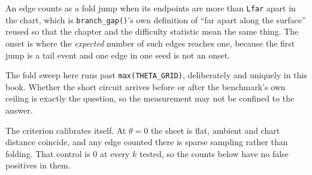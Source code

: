 \documentclass[
  british,
  a4paper,
]{book}
\newenvironment{Shaded}{\begin{snugshade}}{\end{snugshade}}
\newcommand{\AttributeTok}[1]{\textcolor[rgb]{0.13,0.29,0.53}{#1}}
\newcommand{\ControlFlowTok}[1]{\textcolor[rgb]{0.13,0.29,0.53}{\textbf{#1}}}
\newcommand{\DecValTok}[1]{\textcolor[rgb]{0.00,0.00,0.81}{#1}}
\newcommand{\FunctionTok}[1]{\textcolor[rgb]{0.13,0.29,0.53}{\textbf{#1}}}
\newcommand{\NormalTok}[1]{#1}
\newcommand{\OtherTok}[1]{\textcolor[rgb]{0.56,0.35,0.01}{#1}}
\newcommand{\SpecialCharTok}[1]{\textcolor[rgb]{0.81,0.36,0.00}{\textbf{#1}}}
\begin{document}
\begin{Shaded}
\end{Shaded}

An edge counts as a fold jump when its endpoints are more than \texttt{Lfar} apart in
the chart, which is \texttt{branch\_gap()}'s own definition of ``far apart along the
surface'' reused so that the chapter and the difficulty statistic mean the same
thing. The onset is where the \emph{expected} number of such edges reaches one,
because the first jump is a tail event and one edge in one seed is not an onset.

The fold sweep here runs past \texttt{max(THETA\_GRID)}, deliberately and uniquely in
this book. Whether the short circuit arrives before or after the benchmark's own
ceiling is exactly the question, so the measurement may not be confined to the
answer.

The criterion calibrates itself. At \(\theta = 0\) the sheet is flat, ambient and
chart distance coincide, and any edge counted there is sparse sampling rather
than folding. That control is 0 at every \(k\) tested, so the
counts below have no false positives in them.
\end{document}
